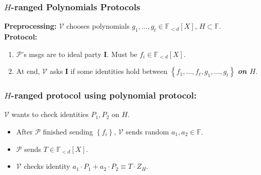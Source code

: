 \documentclass[shadesubsections,trans,14pt,mathserif]{beamer}
\newcommand{\F}{\ensuremath{\mathbb F}}
\newcommand{\set}[1]{\ensuremath{\left\{#1\right\}}}
\newcommand{\ver}{\ensuremath{\mathcal{V}}}
\newcommand{\prv}{\ensuremath{\mathcal{P}}}
\newcommand{\polysofdeg}[1]{\F_{< #1}[X]}
\newcommand{\ideal}{\mathbf{I}}
\begin{document}

\begin{frame}
\frametitle{$H$-ranged Polynomials Protocols}   %
 
 \textbf{Preprocessing:} $\ver$ chooses polynomials $g_1,\ldots,g_t\in \polysofdeg{d}$, $H\subset\F$.\\
 \vspace{0.4in}
\textbf{Protocol:}
 
 \begin{enumerate}

\item $\prv$'s  msgs are to ideal party $\ideal$. Must be $f_i\in \polysofdeg{d}$.
\item At end, $\ver$ asks $\ideal$ if some identities hold between $\set{f_1,\ldots,f_\ell,g_1,\ldots,g_t}$   \textbf{\textit{on $H$}}. 

\end{enumerate}
\end{frame}


\begin{frame}
\frametitle{$H$-ranged protocol using polynomial protocol:}   %
 
 
 $\ver$ wants to check identities $P_1,P_2$ on $H$.\\
 \vspace{0.2in}
\begin{itemize}
\item  After $\prv$ finished sending \set{f_i}, $\ver$ sends random $a_1,a_2\in \F$.\\
\item $\prv$ sends  $T\in \polysofdeg{d}$.\\
\item $\ver$ checks identity
$a_1\cdot P_1 + a_2\cdot P_2 \equiv T\cdot Z_H$.
\end{itemize}


\end{frame}
\end{document}
